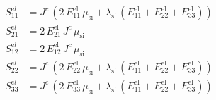 \begin{align}
S^{\mathrm el}_{11} &= J^{c}\,\left(2\,E_{11}^{\mathrm{el}}\,\mu _{\mathrm{si}}+\lambda _{\mathrm{si}}\,\left(E_{11}^{\mathrm{el}}+E_{22}^{\mathrm{el}}+E_{33}^{\mathrm{el}}\right)\right) \\ 
S^{\mathrm el}_{21} &= 2\,E_{21}^{\mathrm{el}}\,J^{c}\,\mu _{\mathrm{si}} \\ 
S^{\mathrm el}_{12} &= 2\,E_{12}^{\mathrm{el}}\,J^{c}\,\mu _{\mathrm{si}} \\ 
S^{\mathrm el}_{22} &= J^{c}\,\left(2\,E_{22}^{\mathrm{el}}\,\mu _{\mathrm{si}}+\lambda _{\mathrm{si}}\,\left(E_{11}^{\mathrm{el}}+E_{22}^{\mathrm{el}}+E_{33}^{\mathrm{el}}\right)\right) \\ 
S^{\mathrm el}_{33} &= J^{c}\,\left(2\,E_{33}^{\mathrm{el}}\,\mu _{\mathrm{si}}+\lambda _{\mathrm{si}}\,\left(E_{11}^{\mathrm{el}}+E_{22}^{\mathrm{el}}+E_{33}^{\mathrm{el}}\right)\right) 
\end{align}
